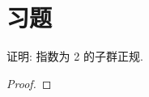 
\section{习题}
    \begin{example}
        证明: 指数为 2 的子群正规.
    \end{example}
    \begin{proof}
        
    \end{proof}